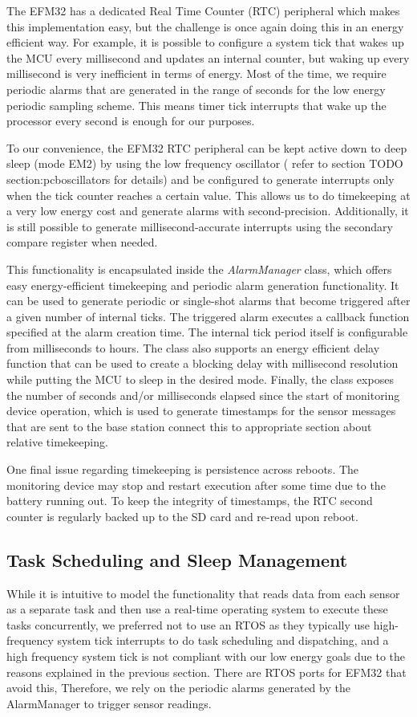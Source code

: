 The EFM32 has a dedicated  Real Time Counter (RTC) peripheral which makes this implementation easy, but the challenge is once again doing this in an energy efficient way. For example, it is possible to configure a system tick that wakes up the MCU every millisecond and updates an internal counter, but waking up every millisecond is very inefficient in terms of energy. Most of the time, we require periodic alarms that are generated in the range of seconds for the low energy periodic sampling scheme. This means timer tick interrupts that wake up the processor every second is enough for our purposes.

To our convenience, the EFM32 RTC peripheral can be kept active down to deep sleep (mode EM2) by using the low frequency oscillator (\TODO{} refer to section TODO section:pcboscillators for details) and be configured to generate interrupts only when the tick counter reaches a certain value. This allows us to do timekeeping at a very low energy cost and generate alarms with second-precision. Additionally, it is still possible to generate millisecond-accurate interrupts using the secondary compare register when needed.

This functionality is encapsulated inside the \textit{AlarmManager} class, which offers easy energy-efficient timekeeping and periodic alarm generation functionality. It can be used to generate periodic or single-shot alarms that become triggered after a given number of internal ticks. The triggered alarm executes a callback function specified at the alarm creation time. The internal tick period itself is configurable from milliseconds to hours. The class also supports an energy efficient delay function that can be used to create a blocking delay with millisecond resolution while putting the MCU to sleep in the desired mode. Finally, the class exposes the number of seconds and/or milliseconds elapsed since the start of monitoring device operation, which is used to generate timestamps for the sensor messages that are sent to the base station \TODO{:} connect this to appropriate section about relative timekeeping.

One final issue regarding timekeeping is persistence across reboots. The monitoring device may stop and restart execution after some time due to the battery running out. To keep the integrity of timestamps, the RTC second counter is regularly backed up to the SD card and re-read upon reboot.

\subsection{Task Scheduling and Sleep Management}
While it is intuitive to model the functionality that reads data from each sensor as a separate task and then use a real-time operating system to execute these tasks concurrently, we preferred not to use an RTOS as they typically use high-frequency system tick interrupts to do task scheduling and dispatching, and a high frequency system tick is not compliant with our low energy goals due to the reasons explained in the previous section. There are RTOS ports for EFM32 that avoid this, Therefore, we rely on the periodic alarms generated by the AlarmManager to trigger sensor readings.

